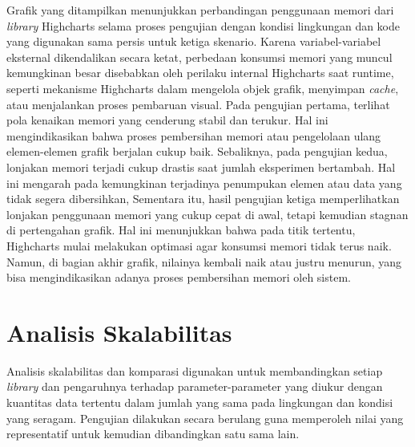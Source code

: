 Grafik yang ditampilkan menunjukkan perbandingan penggunaan memori dari \textit{library} Highcharts selama proses pengujian dengan kondisi lingkungan dan kode yang digunakan sama persis untuk ketiga skenario. Karena variabel-variabel eksternal dikendalikan secara ketat, perbedaan konsumsi memori yang muncul kemungkinan besar disebabkan oleh perilaku internal Highcharts saat runtime, seperti mekanisme Highcharts dalam mengelola objek grafik, menyimpan \textit{cache}, atau menjalankan proses pembaruan visual.
Pada pengujian pertama, terlihat pola kenaikan memori yang cenderung stabil dan terukur. Hal ini mengindikasikan bahwa proses pembersihan memori atau pengelolaan ulang elemen-elemen grafik berjalan cukup baik. Sebaliknya, pada pengujian kedua, lonjakan memori terjadi cukup drastis saat jumlah eksperimen bertambah. Hal ini mengarah pada kemungkinan terjadinya penumpukan elemen atau data yang tidak segera dibersihkan, Sementara itu, hasil pengujian ketiga memperlihatkan lonjakan penggunaan memori yang cukup cepat di awal, tetapi kemudian stagnan di pertengahan grafik. Hal ini menunjukkan bahwa pada titik tertentu, Highcharts mulai melakukan optimasi agar konsumsi memori tidak terus naik. Namun, di bagian akhir grafik, nilainya kembali naik atau justru menurun, yang bisa mengindikasikan adanya proses pembersihan memori oleh sistem.

\section{Analisis Skalabilitas}
Analisis skalabilitas dan komparasi digunakan untuk membandingkan setiap \textit{library} dan pengaruhnya terhadap parameter-parameter yang diukur dengan kuantitas data tertentu dalam jumlah yang sama pada lingkungan dan kondisi yang seragam. Pengujian dilakukan secara berulang guna memperoleh nilai yang representatif untuk kemudian dibandingkan satu sama lain. 
